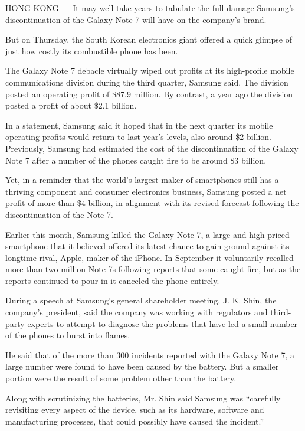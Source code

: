 HONG KONG --- It may well take years to tabulate the full damage
Samsung's discontinuation of the Galaxy Note 7 will have on the
company's brand.

But on Thursday, the South Korean electronics giant offered a quick
glimpse of just how costly its combustible phone has been.

The Galaxy Note 7 debacle virtually wiped out profits at its
high-profile mobile communications division during the third quarter,
Samsung said. The division posted an operating profit of \$87.9 million.
By contrast, a year ago the division posted a profit of about \$2.1
billion.

In a statement, Samsung said it hoped that in the next quarter its
mobile operating profits would return to last year's levels, also around
\$2 billion. Previously, Samsung had estimated the cost of the
discontinuation of the Galaxy Note 7 after a number of the phones caught
fire to be around \$3 billion.

Yet, in a reminder that the world's largest maker of smartphones still
has a thriving component and consumer electronics business, Samsung
posted a net profit of more than \$4 billion, in alignment with its
revised forecast following the discontinuation of the Note 7.

Earlier this month, Samsung killed the Galaxy Note 7, a large and
high-priced smartphone that it believed offered its latest chance to
gain ground against its longtime rival, Apple, maker of the iPhone. In
September
\href{http://www.nytimes3xbfgragh.onion/2016/09/16/business/samsung-galaxy-note-recall.html}{it
voluntarily recalled} more than two million Note 7s following reports
that some caught fire, but as the reports
\href{http://www.nytimes3xbfgragh.onion/2016/10/12/business/international/samsung-galaxy-note7-terminated.html}{continued
to pour in} it canceled the phone entirely.

During a speech at Samsung's general shareholder meeting, J. K. Shin,
the company's president, said the company was working with regulators
and third-party experts to attempt to diagnose the problems that have
led a small number of the phones to burst into flames.

He said that of the more than 300 incidents reported with the Galaxy
Note 7, a large number were found to have been caused by the battery.
But a smaller portion were the result of some problem other than the
battery.

Along with scrutinizing the batteries, Mr. Shin said Samsung was
``carefully revisiting every aspect of the device, such as its hardware,
software and manufacturing processes, that could possibly have caused
the incident.''

